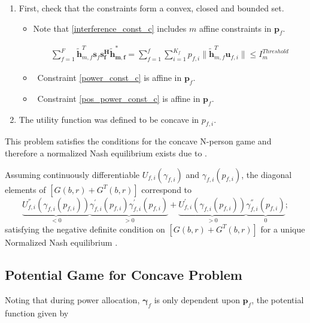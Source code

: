 \documentclass[12pt,a4paper]{report}
\begin{document}
\begin{enumerate}


\item
First, check that the constraints form a convex, closed and bounded set. 

\begin{itemize}

\item
	Note that \eqref{interference_const_c} includes $m$ affine constraints in $\mathbf{p}_{f}$.

\begin{gather*}
	  \sum^F_{f=1} \mathbf{\tilde{h}}_{m,f}^T  \mathbf{s}_{f} 						
	\mathbf{s_{f}^{H}} \mathbf{\tilde{h}_{m,f}^*} 
	=
	\sum_{f=1}^{f}	\sum_{i=1}^{K_f}
	p_{f,i}\|\tilde{\mathbf{h}}_{m,f}^T \mathbf{u}_{f,i}\|
	\leq I^{Threshold}_{m} 
\end{gather*}

\item \
	Constraint \eqref{power_const_c} is  affine in $\mathbf{p}_{f}$.
	
\item \
	Constraint \eqref{pos_power_const_c} is affine in $\mathbf{p}_{f}$.
\end{itemize}


\item The utility function was defined to be concave in $p_{f,i}$. 

\end{enumerate}

This problem satisfies the conditions for the concave N-person game and therefore a  normalized Nash equilibrium exists due to 
\cite[Thm1]{rosen1964existence}.

Assuming continuously differentiable $U_{f,i}(\gamma_{f,i})$ and $\gamma_{f,i}(p_{f,i})$, the diagonal elements of $[G(b,r)+G^{T}(b,r)] $ correspond to
\begin{equation}
\underbrace{U^{''}_{f,i}(\gamma_{f,i}(p_{f,i}))}_{<0}\underbrace{\gamma^{'}_{f,i}(p_{f,i})\gamma^{'}_{f,i}(p_{f,i})}_{>0}
+
\underbrace{U^{'}_{f,i}(\gamma_{f,i}(p_{f,i}))}_{>0}\underbrace{\gamma^{''}_{f,i}(p_{f,i})}_{0};
\end{equation}
satisfying the  negative definite condition on $[G(b,r)+G^{T}(b,r)] $ for a unique Normalized Nash equilibrium \cite[Thm4]{rosen1964existence}.

\subsection{Potential Game for Concave Problem}
Noting that during power allocation, $\boldsymbol{\gamma}_{f}$ is only dependent upon $\mathbf{p}_f$, the potential function given by 
\end{document}
